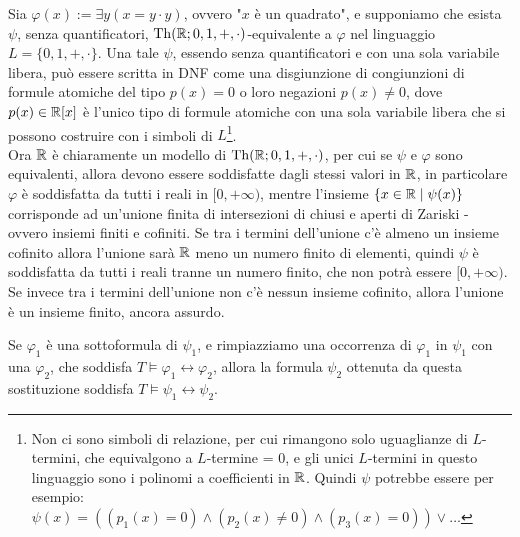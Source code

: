 \begin{soln}
    Sia $\varphi(x) := \exists y (x = y \cdot y)$, ovvero "$x$ è un quadrato", e supponiamo che esista $\psi$, senza quantificatori, $\operatorname{Th}(\mathbb R;0,1,+,\cdot)$-equivalente a $\varphi$ nel linguaggio $L = \{0,1,+,\cdot\}$.
    Una tale $\psi$, essendo senza quantificatori e con una sola variabile libera, può essere scritta in DNF come una disgiunzione di congiunzioni di formule atomiche del tipo $p(x) = 0$ o loro negazioni $p(x) \ne 0$, dove $p(x) \in \mathbb R[x]$ è l'unico tipo di formule atomiche con una sola variabile libera che si possono costruire con i simboli di $L$\footnote{Non ci sono simboli di relazione, per cui rimangono solo uguaglianze di $L$-termini, che equivalgono a $L$-termine = 0, e gli unici $L$-termini in questo linguaggio sono i polinomi a coefficienti in $\mathbb R$.
    Quindi $\psi$ potrebbe essere per esempio: $\psi(x) = ((p_1(x) = 0) \land (p_2(x) \ne 0) \land (p_3(x) = 0))\lor \ldots$}.\\
    Ora $\mathbb R$ è chiaramente un modello di $\operatorname{Th}(\mathbb R;0,1,+,\cdot)$, per cui se $\psi$ e $\varphi$ sono equivalenti, allora devono essere soddisfatte dagli stessi valori in $\mathbb R$, in particolare $\varphi$ è soddisfatta da tutti i reali in $[0,+\infty)$,
    mentre l'insieme $\{x \in \mathbb R \mid \psi(x)\}$ corrisponde ad un'unione finita di intersezioni di chiusi e aperti di Zariski - ovvero insiemi finiti e cofiniti. Se tra i termini dell'unione c'è almeno un insieme cofinito allora l'unione sarà $\mathbb R$
    meno un numero finito di elementi, quindi $\psi$ è soddisfatta da tutti i reali tranne un numero finito, che non potrà essere $[0,+\infty)$. Se invece tra i termini dell'unione non c'è nessun insieme cofinito, allora l'unione è un insieme finito, ancora assurdo.
\end{soln}

\begin{remark}
    Se $\varphi_1$ è una sottoformula di $\psi_1$, e rimpiazziamo una occorrenza di $\varphi_1$ in $\psi_1$ con una $\varphi_2$, che soddisfa $T \models \varphi_1 \leftrightarrow \varphi_2$,
    allora la formula $\psi_2$ ottenuta da questa sostituzione soddisfa $T \models \psi_1 \leftrightarrow \psi_2$.
\end{remark}

